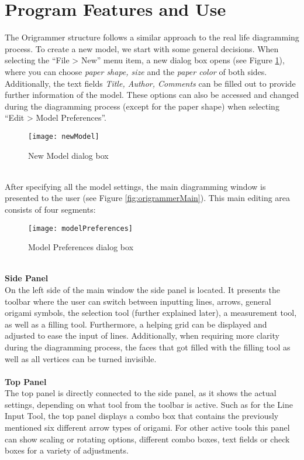 
\section{Program Features and Use}
\label{program}

The Origrammer structure follows a similar approach to the real life diagramming process. To create a new model, we start with some general decisions. When selecting the ``File > New'' menu item, a new dialog box opens (see Figure \ref{fig:newModel}), where you can choose \emph{paper shape, size} and the \emph{paper color} of both sides. Additionally, the text fields \emph{Title, Author, Comments} can be filled out to provide further information of the model. These options can also be accessed and changed during the diagramming process (except for the paper shape) when selecting ``Edit > Model Preferences''.
\begin{figure}[h]
	\centering
	\texttt{[image: newModel]}
	\caption{New Model dialog box}
	\label{fig:newModel}
\end{figure}\\
After specifying all the model settings, the main diagramming window is presented to the user (see Figure \ref{fig:origrammerMain}). This main editing area consists of four segments:\\
\begin{figure}[h]
	\centering
	\texttt{[image: modelPreferences]}
	\caption{Model Preferences dialog box}
	\label{fig:modelPreferences}
\end{figure}
\\
\textbf{Side Panel}\\
On the left side of the main window the side panel is located. It presents the toolbar where the user can switch between inputting lines, arrows, general origami symbols, the selection tool (further explained later), a measurement tool, as well as a filling tool. Furthermore, a helping grid can be displayed and adjusted to ease the input of lines. Additionally, when requiring more clarity during the diagramming process, the faces that got filled with the filling tool as well as all vertices can be turned invisible.\\
\\
\textbf{Top Panel}\\
The top panel is directly connected to the side panel, as it shows the actual settings, depending on what tool from the toolbar is active. Such as for the Line Input Tool, the top panel displays a combo box that contains the previously mentioned six different arrow types of origami. For other active tools this panel can show scaling or rotating options, different combo boxes, text fields or check boxes for a variety of adjustments.\\
